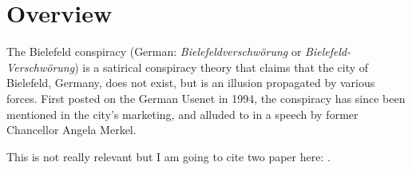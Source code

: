 \section{Overview}
The Bielefeld conspiracy (German: \textit{Bielefeldverschwörung} or \textit{Bielefeld-Verschwörung}) is a satirical conspiracy theory that claims that the city of Bielefeld, Germany, does not exist, but is an illusion propagated by various forces. 
First posted on the German Usenet in 1994, the conspiracy has since been mentioned in the city's marketing, and alluded to in a speech by former Chancellor Angela Merkel. 

This is not really relevant but I am going to cite two paper here: \textcite{Ye2023, ye2023learning}.
